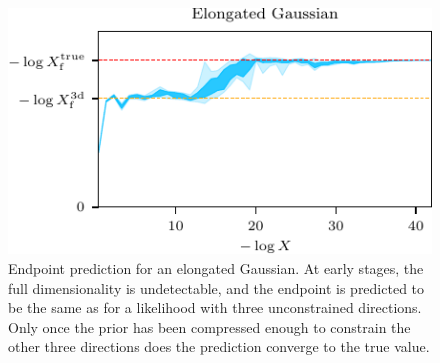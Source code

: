 \documentclass[usenatbib]{mnras}
\begin{document}
\begin{figure}
\begin{center}
    \includegraphics{figures/elongated_logXfs}
\end{center}
\caption{Endpoint prediction for an elongated Gaussian. At early stages, the full dimensionality is undetectable, and the endpoint is predicted to be the same as for a likelihood with three unconstrained directions. Only once the prior has been compressed enough to constrain the other three directions does the prediction converge to the true value.}
\label{fig:elongated_logXfs}
\end{figure}
\end{document}
